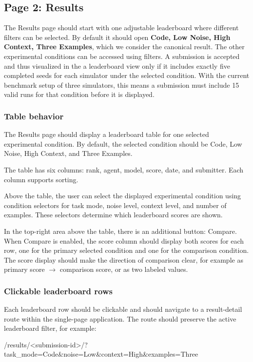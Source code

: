 \documentclass[11pt]{article}
\begin{document}
\label{sec:website-page-results}
\subsection*{Page 2: Results}
The Results page should start with one adjustable leaderboard where different filters can be selected. 
By default it should open \textbf{Code, Low Noise, High Context, Three Examples}, which we consider the canonical result.
The other experimental conditions can be accessed using filters.
A submission is accepted and thus visualized in the a leaderboard view only if it includes exactly five completed seeds for each simulator under the selected condition. 
With the current benchmark setup of three simulators, this means a submission must include 15 valid runs for that condition before it is displayed.


\subsubsection*{Table behavior}
The Results page should display a leaderboard table for one selected experimental condition.
By default, the selected condition should be Code, Low Noise, High Context, and Three Examples.

The table has six columns: rank, agent, model, score, date, and submitter.
Each column supports sorting.

Above the table, the user can select the displayed experimental condition using condition selectors for task mode, noise level, context level, and number of examples.
These selectors determine which leaderboard scores are shown.

In the top-right area above the table, there is an additional button: Compare.
When Compare is enabled, the score column should display both scores for each row, one for the primary selected condition and one for the comparison condition.
The score display should make the direction of comparison clear, for example as primary score \(\rightarrow\) comparison score, or as two labeled values.

\subsubsection*{Clickable leaderboard rows}
Each leaderboard row should be clickable and should navigate to a result-detail route within the single-page application. 
The route should preserve the active leaderboard filter, for example:

\begin{DocCode}
/results/<submission-id>/?task_mode=Code&noise=Low&context=High&examples=Three
\end{DocCode}
\end{document}
